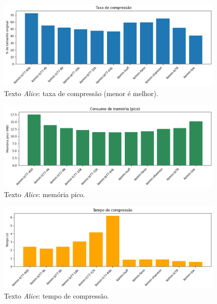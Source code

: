 \begin{figure}[htp]
  \centering
  \caption{Texto \textit{Alice}: taxa de compressão (menor é melhor).}
  \label{fig:komm-alice-compression}
  \includegraphics[width=15cm]{figuras/komm_alice_compression.png}
\end{figure}

\begin{figure}[htp]
  \centering
  \caption{Texto \textit{Alice}: memória pico.}
  \label{fig:komm-alice-memory}
  \includegraphics[width=15cm]{figuras/komm_alice_memory.png}
\end{figure}

\begin{figure}[htp]
  \centering
  \caption{Texto \textit{Alice}: tempo de compressão.}
  \label{fig:komm-alice-time}
  \includegraphics[width=15cm]{figuras/komm_alice_time.png}
\end{figure}

